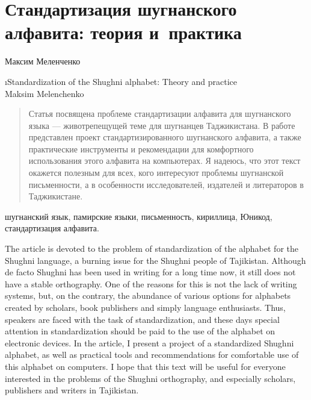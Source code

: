 \chapter*{Стандартизация шугнанского алфавита: теория и~практика}
\setcounter{section}{0}
\label{chapter-melen-ortho}

\begin{customauthorname}
Максим Меленченко
\end{customauthorname}

\begin{englishtitle}
\i{Standardization of the Shughni alphabet: Theory and practice\\{\small Maksim Melenchenko}}
\end{englishtitle}

\begin{abstract}
Статья посвящена проблеме стандартизации алфавита для шугнанского языка — животрепещущей теме для шугнанцев Таджикистана. В работе представлен проект стандартизированного шугнанского алфавита, а также практические инструменты и рекомендации для комфортного использования этого алфавита на компьютерах. Я надеюсь, что этот текст окажется полезным для всех, кого интересуют проблемы шугнанской письменности, а в особенности исследователей, издателей и литераторов в Таджикистане.
\end{abstract}

\begin{keywords}
шугнанский язык, памирские языки, письменность, кириллица, Юникод, стандартизация алфавита.
\end{keywords}

\begin{eng-abstract}
The article is devoted to the problem of standardization of the alphabet for the Shughni language, a burning issue for the Shughni people of Tajikistan. Although de facto Shughni has been used in writing for a long time now, it still does not have a stable orthography. One of the reasons for this is not the lack of writing systems, but, on the contrary, the abundance of various options for alphabets created by scholars, book publishers and simply language enthusiasts. Thus, speakers are faced with the task of standardization, and these days special attention in standardization should be paid to the use of the alphabet on electronic devices. In the article, I present a project of a standardized Shughni alphabet, as well as practical tools and recommendations for comfortable use of this alphabet on computers. I hope that this text will be useful for everyone interested in the problems of the Shughni orthography, and especially scholars, publishers and writers in Tajikistan.
\end{eng-abstract}


